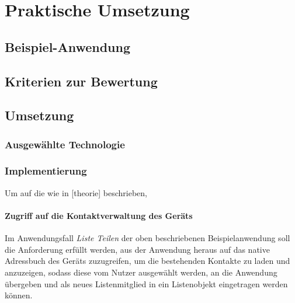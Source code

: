 \chapter{Praktische Umsetzung} %

	\section{Beispiel-Anwendung} %

	\section{Kriterien zur Bewertung}

\section{Umsetzung}

\subsection{Ausgewählte Technologie} %
\subsection{Implementierung} %

Um auf die wie in [theorie] beschrieben, 
		
\subsubsection{Zugriff auf die Kontaktverwaltung des Geräts}

Im Anwendungsfall \emph{Liste Teilen} der oben beschriebenen Beispielanwendung  soll die Anforderung erfüllt werden, aus der Anwendung heraus auf das native Adressbuch des Geräts zuzugreifen, um die bestehenden Kontakte zu laden und anzuzeigen, sodass diese vom Nutzer ausgewählt werden, an die Anwendung übergeben und als neues Listenmitglied in ein Listenobjekt eingetragen werden können.

